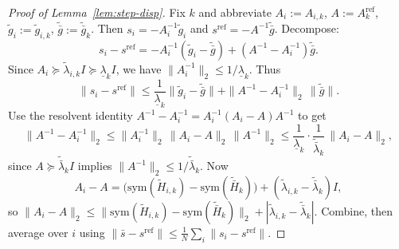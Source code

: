 \documentclass[11pt,a4paper]{article}
\begin{document}
\begin{proof}[Proof of Lemma~\ref{lem:step-disp}]
Fix $k$ and abbreviate $A_i:=A_{i,k}$, $A:=A_k^{\mathrm{ref}}$, $\tilde g_i:=\tilde g_{i,k}$, $\tilde{\bar g}:=\tilde{\bar g}_k$.
Then $s_i=-A_i^{-1}\tilde g_i$ and $s^{\mathrm{ref}}=-A^{-1}\tilde{\bar g}$.
Decompose:
\[
s_i-s^{\mathrm{ref}}
=-A_i^{-1}(\tilde g_i-\tilde{\bar g}) + (A^{-1}-A_i^{-1})\tilde{\bar g}.
\]
Since $A_i\succeq \tilde\lambda_{i,k}I\succeq \underline\lambda_k I$, we have $\|A_i^{-1}\|_2\le 1/\underline\lambda_k$.
Thus
\[
\|s_i-s^{\mathrm{ref}}\|
\le \frac1{\underline\lambda_k}\|\tilde g_i-\tilde{\bar g}\|+\|A^{-1}-A_i^{-1}\|_2\,\|\tilde{\bar g}\|.
\]
Use the resolvent identity $A^{-1}-A_i^{-1}=A_i^{-1}(A_i-A)A^{-1}$ to get
\[
\|A^{-1}-A_i^{-1}\|_2\le \|A_i^{-1}\|_2\,\|A_i-A\|_2\,\|A^{-1}\|_2
\le \frac1{\underline\lambda_k}\cdot \frac1{\tilde{\bar\lambda}_k}\,\|A_i-A\|_2,
\]
since $A\succeq \tilde{\bar\lambda}_k I$ implies $\|A^{-1}\|_2\le 1/\tilde{\bar\lambda}_k$.
Now
\[
A_i-A=\big(\mathrm{sym}(\tilde H_{i,k})-\mathrm{sym}(\tilde{\bar H}_k)\big)+(\tilde\lambda_{i,k}-\tilde{\bar\lambda}_k)I,
\]
so $\|A_i-A\|_2\le \|\mathrm{sym}(\tilde H_{i,k})-\mathrm{sym}(\tilde{\bar H}_k)\|_2+|\tilde\lambda_{i,k}-\tilde{\bar\lambda}_k|$.
Combine, then average over $i$ using $\|\bar s-s^{\mathrm{ref}}\|\le \frac1N\sum_i\|s_i-s^{\mathrm{ref}}\|$.
\end{proof}
\end{document}
